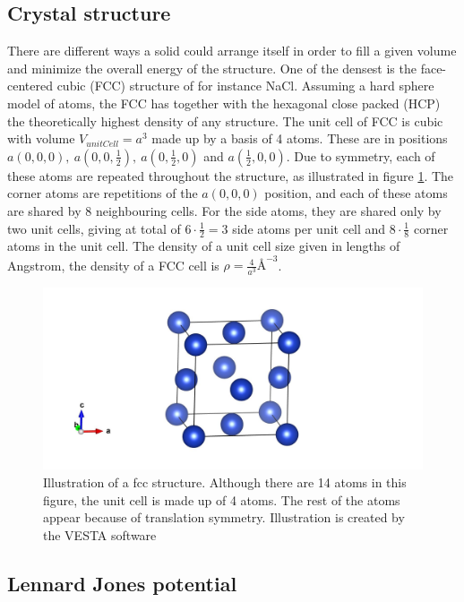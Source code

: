 \subsection{Crystal structure}

There are different ways a solid could arrange itself in order to fill a given volume and minimize the overall energy of the structure. One of the densest is the face-centered cubic (FCC) structure of for instance NaCl. Assuming a hard sphere model of atoms, the FCC has together with the hexagonal close packed (HCP) the theoretically highest density of any structure. The unit cell of FCC is cubic with volume $ V_{unitCell} = a^3 $ made up by a basis of 4 atoms. These are in positions $ a(0,0,0), \ a(0,0,\frac{1}{2}),\ a(0,\frac{1}{2}, 0)   $ and $ a(\frac{1}{2}, 0,0) $. Due to symmetry, each of these atoms are repeated throughout the structure, as illustrated in figure \ref{fig:fcc}. The corner atoms are  repetitions of the $ a(0,0,0)$ position, and each of these atoms are shared by 8 neighbouring cells. For the side atoms, they are shared only by two unit cells, giving at total of $ 6\cdot \frac{1}{2}=3 $ side atoms per unit cell and $ 8\cdot  \frac{1}{8}$ corner atoms in the unit cell. The density of a unit cell size given in lengths of Angstrom, the density of a FCC cell  is $\rho=  \frac{4}{a^3} \text{\AA}^{-3}$. 

\begin{figure}[H]
	\centering
	\includegraphics[width=0.7\linewidth]{../figures/fcc.jpg}
	\caption{Illustration of a fcc structure. Although there are 14 atoms in this figure, the unit cell is made up of 4 atoms. The rest of the atoms appear because of translation symmetry. Illustration is created by the VESTA software \cite{VESTA}}
	\label{fig:fcc}
\end{figure}

\subsection{Lennard Jones potential \label{sec:LJ}}

